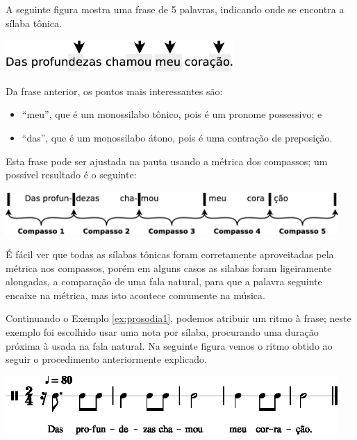 
\begin{example}
\label{ex:prosodia1}
A seguinte figura mostra uma frase de 5 palavras, indicando onde se encontra a sílaba tônica.
\begin{center}
\includegraphics[width=0.65\textwidth]{chapters/cap-musica-topicos/prosodia1.eps}
\end{center}
Da frase anterior, os pontos mais interessantes são:
\begin{itemize}
\item ``meu'', que é um monossilabo tônico, pois é um pronome possessivo; e
\item ``das'', que é um monossilabo átono, pois é uma contração de preposição.
\end{itemize}
Esta frase pode ser ajustada na pauta usando a métrica dos compassos;
um possível resultado é o seguinte:
\begin{center}
\includegraphics[width=0.95\textwidth]{chapters/cap-musica-topicos/prosodia2.eps}
\end{center}
É fácil ver que todas as sílabas tônicas foram corretamente 
aproveitadas pela métrica nos compassos,
porém em alguns casos as silabas foram ligeiramente alongadas, a comparação de uma fala natural,
para que a palavra seguinte encaixe na métrica,
mas isto acontece comumente na música. 
\end{example}

\begin{example}
\label{ex:prosodia2}
Continuando o Exemplo \ref{ex:prosodia1}, podemos atribuir um ritmo à frase; 
neste exemplo foi escolhido usar uma nota por sílaba, 
procurando uma duração próxima à usada na fala natural.
Na seguinte figura vemos o ritmo obtido ao seguir o procedimento anteriormente explicado. 
\begin{center}
\includegraphics[width=0.95\textwidth]{chapters/cap-musica-topicos/frase5a-1.eps}
\end{center}
\end{example}

